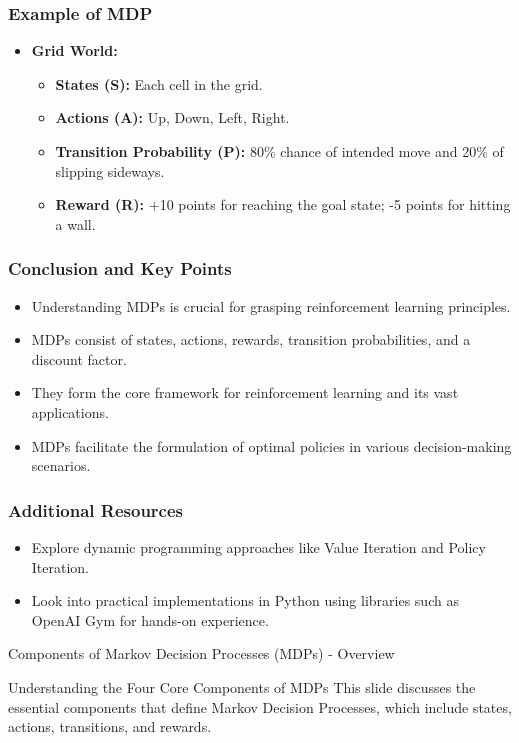 \documentclass[aspectratio=169]{beamer}
\begin{document}
\begin{frame}[fragile]
    \frametitle{Example of MDP}
    \begin{itemize}
        \item \textbf{Grid World:} 
            \begin{itemize}
                \item \textbf{States (S):} Each cell in the grid.
                \item \textbf{Actions (A):} Up, Down, Left, Right.
                \item \textbf{Transition Probability (P):} 80\% chance of intended move and 20\% of slipping sideways.
                \item \textbf{Reward (R):} +10 points for reaching the goal state; -5 points for hitting a wall.
            \end{itemize}
    \end{itemize}
\end{frame}

\begin{frame}[fragile]
    \frametitle{Conclusion and Key Points}
    \begin{itemize}
        \item Understanding MDPs is crucial for grasping reinforcement learning principles.
        \item MDPs consist of states, actions, rewards, transition probabilities, and a discount factor.
        \item They form the core framework for reinforcement learning and its vast applications.
        \item MDPs facilitate the formulation of optimal policies in various decision-making scenarios.
    \end{itemize}
\end{frame}

\begin{frame}[fragile]
    \frametitle{Additional Resources}
    \begin{itemize}
        \item Explore dynamic programming approaches like Value Iteration and Policy Iteration.
        \item Look into practical implementations in Python using libraries such as OpenAI Gym for hands-on experience.
    \end{itemize}
\end{frame}

\begin{frame}[fragile]{Components of Markov Decision Processes (MDPs) - Overview}
    \begin{block}{Understanding the Four Core Components of MDPs}
        This slide discusses the essential components that define Markov Decision Processes, which include states, actions, transitions, and rewards.
    \end{block}
\end{frame}
\end{document}
